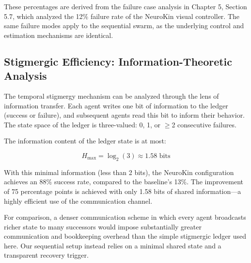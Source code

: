﻿\documentclass[12pt,a4paper,oneside]{report}
\begin{document}
\begin{table}[H]
\centering
\caption{Failure mode distribution for NeuroKin sequential swarm (derived from Chapter 5 analysis).}
\label{tab:failure_modes_swarm}
\end{table}

These percentages are derived from the failure case analysis in Chapter 5, Section 5.7, which analyzed the 12\% failure rate of the NeuroKin visual controller. The same failure modes apply to the sequential swarm, as the underlying control and estimation mechanisms are identical.

\subsection{Stigmergic Efficiency: Information-Theoretic Analysis}

The temporal stigmergy mechanism can be analyzed through the lens of information transfer. Each agent writes one bit of information to the ledger (success or failure), and subsequent agents read this bit to inform their behavior. The state space of the ledger is three-valued: 0, 1, or $\geq$2 consecutive failures.

The information content of the ledger state is at most:

\begin{equation}
H_{\text{max}} = \log_2(3) \approx 1.58 \text{ bits}
\end{equation}

With this minimal information (less than 2 bits), the NeuroKin configuration achieves an 88\% success rate, compared to the baseline's 13\%. The improvement of 75 percentage points is achieved with only 1.58 bits of shared information---a highly efficient use of the communication channel.

For comparison, a denser communication scheme in which every agent broadcasts richer state to many successors would impose substantially greater communication and bookkeeping overhead than the simple stigmergic ledger used here. Our sequential setup instead relies on a minimal shared state and a transparent recovery trigger.
\end{document}
